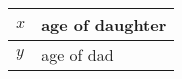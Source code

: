 \begin{table}[H]
    \centering
    \begin{tabular}{|l|l|}
    \hline
      $x$   & age of daughter \\
      \hline
      $y$   & age of dad \\
      \hline
      
    \end{tabular}
    \caption{}
    \label{tab:tables/table.tex}
\end{table}
